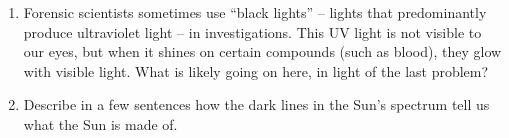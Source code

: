 \documentclass[11pt]{article}
\begin{document}
\begin{enumerate}
		\vspace{1.7in}
		
		\item Forensic scientists sometimes use ``black lights'' -- lights that predominantly produce ultraviolet light -- in investigations. This UV light is not visible to our eyes, but when it shines on certain compounds 
		(such as blood), they glow with visible light. What is likely going on here, in light of the last problem?
		
		\vspace{1.7in}
		
		\item Describe in a few sentences how the dark lines in the Sun's spectrum tell us what the Sun is made of.
	\end{enumerate}
\end{document}
